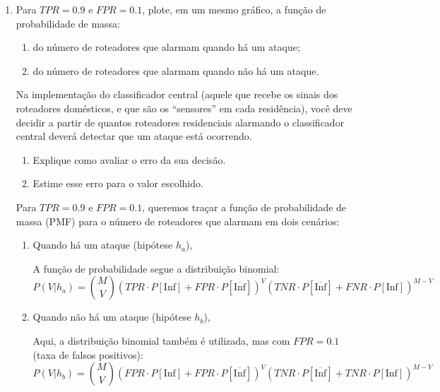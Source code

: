 \documentclass[12 pt]{article}
\begin{document}
\begin{enumerate}
    \item Para $TPR = 0.9$ e $FPR = 0.1$, plote, em um mesmo gráfico, a função de probabilidade de massa:
    \begin{enumerate}
        \item do número de roteadores que alarmam quando há um ataque;
        \item do número de roteadores que alarmam quando não há um ataque.
    \end{enumerate}
    Na implementação do classificador central (aquele que recebe os sinais dos roteadores domésticos, e que são os “sensores” em cada residência), você deve decidir a partir de quantos roteadores residenciais alarmando o classificador central deverá detectar que um ataque está ocorrendo.
    \begin{enumerate}
        \item Explique como avaliar o erro da sua decisão.
        \item Estime esse erro para o valor escolhido.
    \end{enumerate}


    \begin{tcolorbox}[colback=white, colframe=black, title=Resposta:]

        Para \( TPR = 0.9 \) e \( FPR = 0.1 \), queremos traçar a função de probabilidade de massa (PMF) para o número de roteadores que alarmam em dois cenários:
        
        \begin{enumerate}
            \item Quando há um ataque (hipótese \( h_a \)),
            
            A função de probabilidade segue a distribuição binomial:
            $$
            P(V | h_a) = \binom{M}{V} (TPR \cdot P[\text{Inf}]  + FPR \cdot P[\overline{\text{Inf}}])^V (TNR \cdot P[\overline{\text{Inf}}] + FNR \cdot P[\text{Inf}])^{M - V}
            $$

            \item Quando não há um ataque (hipótese \( h_b \)),
            
            Aqui, a distribuição binomial também é utilizada, mas com \( FPR = 0.1 \) (taxa de falsos positivos):
           $$
           P(V | h_b) = \binom{M}{V} (FPR \cdot P[\text{Inf}] + FPR  \cdot P[\overline{\text{Inf}}])^V (TNR  \cdot P[\overline{\text{Inf}}] + TNR \cdot P[\text{Inf}])^{M - V}
           $$


\end{enumerate}
\end{tcolorbox}
\end{enumerate}
\end{document}
